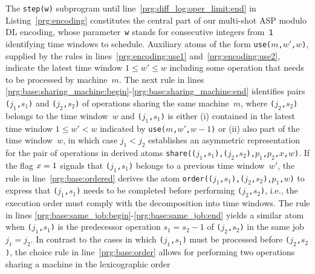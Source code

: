 \documentclass{tlp} %
\begin{document}
The \lstinline{step(w)} subprogram until line~\ref{prg:diff_log:oper_limit:end} 
in Listing~\ref{prg:encoding} constitutes the central part of our multi-shot ASP modulo DL encoding, whose parameter~\lstinline{w} stands for consecutive integers from~\lstinline{1}
identifying time windows to schedule.
Auxiliary atoms of the form \lstinline{use(}$m$\lstinline{,}$w'$\lstinline{,}$w$\lstinline{)},
supplied by the rules in lines~\ref{prg:encoding:use1} and~\ref{prg:encoding:use2},
indicate the latest time window $1\leq w'\leq w$ including some operation that needs
to be processed by machine~$m$.
The next rule in lines \ref{prg:base:sharing_machine:begin}-\ref{prg:base:sharing_machine:end}
identifies pairs \lstinline{(}$j_1$\lstinline{,}$s_1$\lstinline{)} and
\lstinline{(}$j_2$\lstinline{,}$s_2$\lstinline{)} of operations sharing
the same machine~$m$,
where
\lstinline{(}$j_2$\lstinline{,}$s_2$\lstinline{)} belongs to the time window~$w$ and
\lstinline{(}$j_1$\lstinline{,}$s_1$\lstinline{)} is either 
(i)
contained in the latest time window $1\leq w'< w$ indicated by
\lstinline{use(}$m$\lstinline{,}$w'$\lstinline{,}$w-1$\lstinline{)} or
(ii)
also part of the time window~$w$, in which case $j_1 < j_2$ establishes
an asymmetric representation for the pair of operations in derived atoms
\lstinline{share((}$j_1$\lstinline{,}$s_1$\lstinline{),(}$j_2$\lstinline{,}$s_2$\lstinline{),}$p_1$\lstinline{,}$p_2$\lstinline{,}$x$\lstinline{,}$w$\lstinline{)}.
If the flag $x=\text{\lstinline{1}}$ signals that 
\lstinline{(}$j_1$\lstinline{,}$s_1$\lstinline{)}
belongs to a previous time window~$w'$,
the rule in line~\ref{prg:base:ordered} %
derives the atom
\lstinline{order((}$j_1$\lstinline{,}$s_1$\lstinline{),(}$j_2$\lstinline{,}$s_2$\lstinline{),}$p_1$\lstinline{,}$w$\lstinline{)}
to express that \lstinline{(}$j_1$\lstinline{,}$s_1$\lstinline{)} needs to be completed
before performing \lstinline{(}$j_2$\lstinline{,}$s_2$\lstinline{)}, i.e.,
the execution order must comply with the decomposition into time windows.
The rule in lines \ref{prg:base:same_job:begin}-\ref{prg:base:same_job:end} yields
a similar atom when \lstinline{(}$j_1$\lstinline{,}$s_1$\lstinline{)}
is the predecessor operation $s_1 = s_2-1$ of \lstinline{(}$j_2$\lstinline{,}$s_2$\lstinline{)}
in the same job $j_1=j_2$.
In contrast to the cases in which 
\lstinline{(}$j_1$\lstinline{,}$s_1$\lstinline{)} must be processed before
\lstinline{(}$j_2$\lstinline{,}$s_2$\lstinline{)},
the choice rule in line~\ref{prg:base:order}
allows for performing two operations sharing a machine in the lexicographic order
\end{document}
